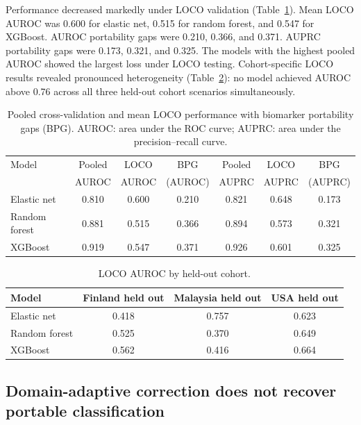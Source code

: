 \documentclass[12pt,a4paper]{article}
\begin{document}
Performance decreased markedly under LOCO validation
(Table~\ref{tab:performance}). Mean LOCO AUROC was 0.600 for elastic net,
0.515 for random forest, and 0.547 for XGBoost. AUROC portability gaps were
0.210, 0.366, and 0.371. AUPRC portability gaps were 0.173, 0.321, and
0.325. The models with the highest pooled AUROC showed the largest loss under
LOCO testing. Cohort-specific LOCO results revealed pronounced heterogeneity
(Table~\ref{tab:loco-by-cohort}): no model achieved AUROC above 0.76 across
all three held-out cohort scenarios simultaneously.

\begin{table}[h]
\centering
\caption{Pooled cross-validation and mean LOCO performance with biomarker
portability gaps (BPG). AUROC: area under the ROC curve; AUPRC: area under
the precision--recall curve.}
\label{tab:performance}
\begin{tabular}{lcccccc}
\toprule
Model & Pooled & LOCO & BPG & Pooled & LOCO & BPG \\
      & AUROC  & AUROC & (AUROC) & AUPRC & AUPRC & (AUPRC) \\
\midrule
Elastic net   & 0.810 & 0.600 & 0.210 & 0.821 & 0.648 & 0.173 \\
Random forest & 0.881 & 0.515 & 0.366 & 0.894 & 0.573 & 0.321 \\
XGBoost       & 0.919 & 0.547 & 0.371 & 0.926 & 0.601 & 0.325 \\
\bottomrule
\end{tabular}
\end{table}

\begin{table}[h]
\centering
\caption{LOCO AUROC by held-out cohort.}
\label{tab:loco-by-cohort}
\begin{tabular}{lccc}
\toprule
Model & Finland held out & Malaysia held out & USA held out \\
\midrule
Elastic net   & 0.418 & 0.757 & 0.623 \\
Random forest & 0.525 & 0.370 & 0.649 \\
XGBoost       & 0.562 & 0.416 & 0.664 \\
\bottomrule
\end{tabular}
\end{table}

\subsection{Domain-adaptive correction does not recover portable
classification}
\end{document}
